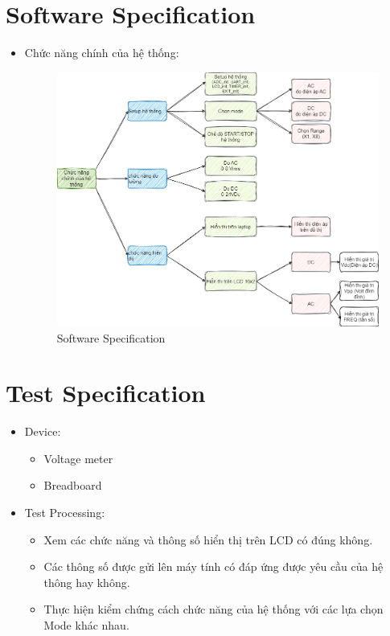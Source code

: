 	\section{Software Specification}
	\begin{itemize}[label=-]
		\item Chức năng chính của hệ thống:\\
		\begin{figure}[H]
			\includegraphics[width=\linewidth]{picture/software_flowchart.png}
			\caption{Software Specification}
			\label{t_software specification}
		\end{figure}
	\end{itemize}
	
	\section{Test Specification}
	\begin{itemize}[label=-]
		\item Device:
		\begin{itemize}[label=+]
			\item Voltage meter
			\item Breadboard
		\end{itemize}
		\item Test Processing:
		\begin{itemize}[label=+]
			\item Xem các chức năng và thông số hiển thị trên LCD có đúng không.
			\item Các thông số được gửi lên máy tính có đáp ứng được yêu cầu của hệ thông hay không.
			\item Thực hiện kiểm chứng cách chức năng của hệ thống với các lựa chọn Mode khác nhau.
		\end{itemize}
	\end{itemize}

